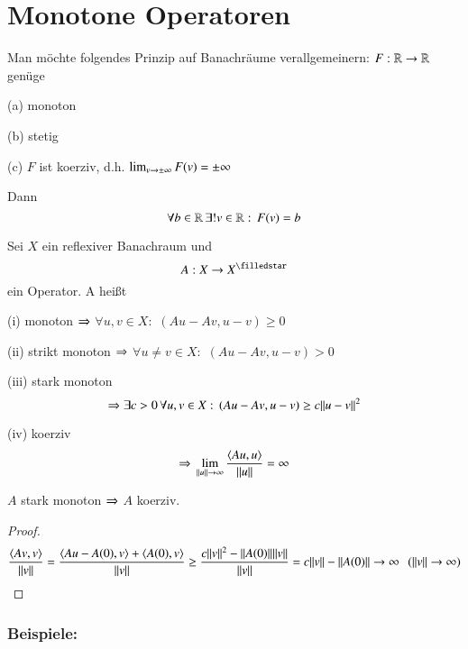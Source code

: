 \section{Monotone Operatoren}

Man möchte folgendes Prinzip auf Banachräume verallgemeinern: $F:\mathbb{R}\rightarrow\mathbb{R}$ genüge
\begin{description}
    \item{(a)}
    monoton
    \item{(b)}
    stetig
    \item{(c)}
    $F$ ist koerziv, d.h. $\lim_{v\rightarrow \pm \infty} F(v)=\pm \infty$
\end{description}
Dann
\[
    \forall b\in \mathbb{R} \, \exists ! v\in \mathbb{R}: \, F(v)=b
\]

\begin{defi}\label{4.1}
    Sei $X$ ein reflexiver Banachraum und
    \[
        A:X\ra X^\star
    \]
    ein Operator. A heißt
    \begin{description}
        \item{(i)}
        monoton $\Rightarrow$ $\forall u,v\in X:$ $(Au-Av,u-v)\geq 0$
        \item{(ii)}
        strikt monoton $\Rightarrow$ $\forall u\neq v\in X:$ $(Au-Av,u-v)>0$
        \item{(iii)}
        stark monoton
        \[
            \Rightarrow \exists c>0 \, \forall u,v\in X:\, (Au-Av,u-v)\geq c\|u-v\|^2
        \]
        \item{(iv)}
        koerziv
        \[
            \Rightarrow \, \lim_{\|u\|\rightarrow \infty}\frac{ \langle Au,u\rangle }{\|u\|}=\infty
        \]
    \end{description}
\end{defi}

\begin{remark}
    $A$ stark monoton $\Rightarrow$ $A$ koerziv.
\end{remark}

\begin{proof}
    \[
        \frac{\langle Av,v\rangle}{\|v\|}=\frac{ \langle Au-A(0), v\rangle + \langle A(0),v\rangle }{\|v\|}
        \geq \frac{c\|v\|^2 - \|A(0)\|\|v\|}{\|v\|} = c\|v\| - \|A(0)\|\rightarrow \infty \hspace{.25cm} (\|v\|\rightarrow \infty)
    \]
\end{proof}

\subsubsection*{Beispiele:}

